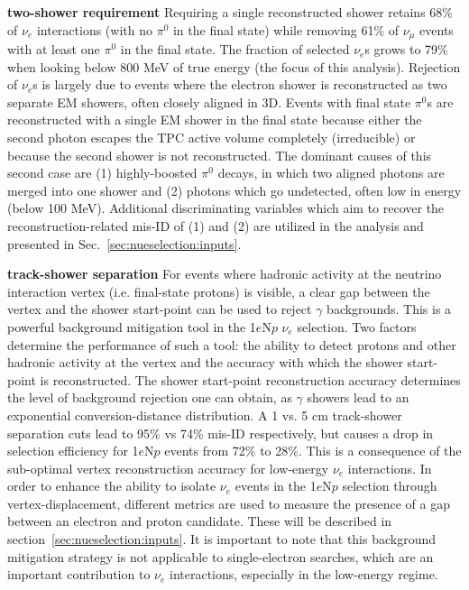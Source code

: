 \documentclass[a4paper]{article}
\begin{document}
\par \textbf{two-shower requirement} Requiring a single reconstructed shower retains 68\% of $\nu_e$ interactions (with no $\pi^0$ in the final state) while removing 61\% of $\nu_{\mu}$ events with at least one $\pi^0$ in the final state. The fraction of selected $\nu_e$s grows to 79\% when looking below 800 MeV of true energy (the focus of this analysis). Rejection of $\nu_e$s is largely due to events where the electron shower is reconstructed as two separate EM showers, often closely aligned in 3D. Events with final state $\pi^0$s are reconstructed with a single EM shower in the final state because either the second photon escapes the TPC active volume completely (irreducible) or because the second shower is not reconstructed. The dominant causes of this second case are (1) highly-boosted $\pi^0$ decays, in which two aligned photons are merged into one shower and (2) photons which go undetected, often low in energy (below 100 MeV). Additional discriminating variables which aim to recover the reconstruction-related mis-ID of (1) and (2) are utilized in the analysis and presented in Sec.~\ref{sec:nueselection:inputs}.
\par \textbf{track-shower separation} For events where hadronic activity at the neutrino interaction vertex (i.e. final-state protons) is visible, a clear gap between the vertex and the shower start-point can be used to reject $\gamma$ backgrounds. This is a powerful background mitigation tool in the 1$e$N$p$ $\nu_e$ selection. Two factors determine the performance of such a tool: the ability to detect protons and other hadronic activity at the vertex and the accuracy with which the shower start-point is reconstructed. The shower start-point reconstruction accuracy determines the level of background rejection one can obtain, as $\gamma$ showers lead to an exponential conversion-distance distribution. A 1 vs. 5 cm track-shower separation cuts lead to 95\% vs 74\% mis-ID respectively, but causes a drop in selection efficiency for 1$e$N$p$ events from 72\% to 28\%. This is a consequence of the sub-optimal vertex reconstruction accuracy for low-energy $\nu_e$ interactions. In order to enhance the ability to isolate $\nu_e$ events in the 1$e$N$p$ selection through vertex-displacement, different metrics are used to measure the presence of a gap between an electron and proton candidate. These will be described in section~\ref{sec:nueselection:inputs}. It is important to note that this background mitigation strategy is not applicable to single-electron searches, which are an important contribution to $\nu_e$ interactions, especially in the low-energy regime.
\end{document}
